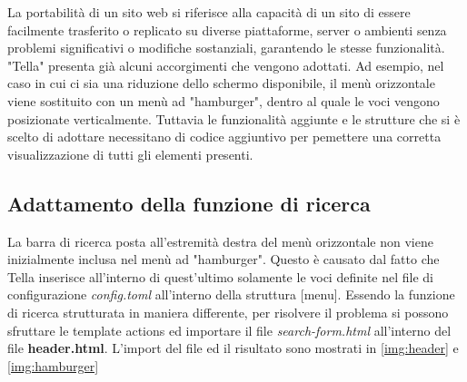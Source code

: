 \documentclass[target=bach,aauheader=]{thud}
\begin{document}
\newline
La portabilità di un sito web si riferisce alla capacità di un sito di essere facilmente trasferito o replicato su diverse piattaforme, server o ambienti senza problemi significativi o modifiche sostanziali, garantendo le stesse funzionalità.
\newline
"Tella" presenta già alcuni accorgimenti che vengono adottati. Ad esempio, nel caso in cui ci sia una riduzione dello schermo disponibile, 
il menù orizzontale viene sostituito con un menù ad "hamburger", dentro al quale le voci vengono posizionate verticalmente.
\newline
Tuttavia le funzionalità aggiunte e le strutture che si è scelto di adottare necessitano di codice aggiuntivo per pemettere una corretta visualizzazione di tutti gli elementi presenti.
\subsection{Adattamento della funzione di ricerca}
La barra di ricerca posta all'estremità destra del menù orizzontale non viene inizialmente inclusa nel menù ad "hamburger". 
Questo è causato dal fatto che Tella inserisce all'interno di quest'ultimo solamente le voci definite nel file di configurazione \textit{config.toml} all'interno della struttura [menu].
\newline
Essendo la funzione di ricerca strutturata in maniera differente, per risolvere il problema si possono sfruttare le template actions ed importare il file \textit{search-form.html} all'interno del file \textbf{header.html}. 
L'import del file ed il risultato sono mostrati in \cref{img:header} e \cref{img:hamburger}

\end{document}
